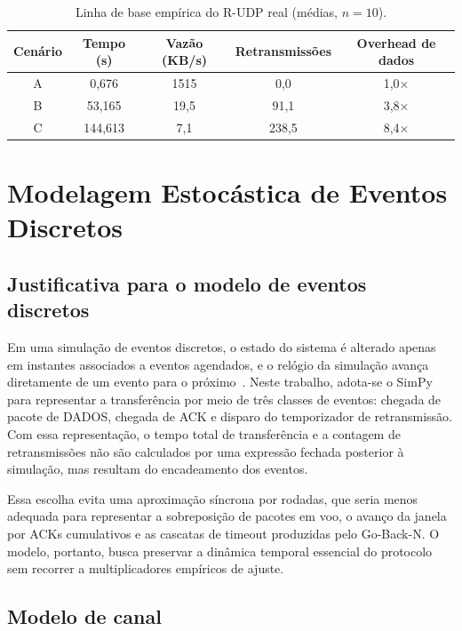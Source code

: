 \documentclass[12pt]{article}
\begin{document}
\begin{table}[ht]
\centering
\caption{Linha de base empírica do R-UDP real (médias, $n=10$).}
\label{tab:baseline}
\begin{tabular}{ccccc}
\toprule
\textbf{Cenário} & \textbf{Tempo (s)} & \textbf{Vazão (KB/s)} &
\textbf{Retransmissões} & \textbf{Overhead de dados} \\
\midrule
A & 0{,}676   & 1515 & 0{,}0   & 1{,}0$\times$ \\
B & 53{,}165  & 19{,}5 & 91{,}1  & 3{,}8$\times$ \\
C & 144{,}613 & 7{,}1  & 238{,}5 & 8{,}4$\times$ \\
\bottomrule
\end{tabular}
\end{table}

\section{Modelagem Estocástica de Eventos Discretos}
\label{sec:modelo}

\subsection{Justificativa para o modelo de eventos discretos}

Em uma simulação de eventos discretos, o estado do sistema é alterado apenas em instantes
associados a eventos agendados, e o relógio da simulação avança diretamente de um evento
para o próximo~\cite{law2015}. Neste trabalho, adota-se o SimPy~\cite{simpy} para
representar a transferência por meio de três classes de eventos: chegada de pacote de
DADOS, chegada de ACK e disparo do temporizador de retransmissão. Com essa representação,
o tempo total de transferência e a contagem de retransmissões não são calculados por uma
expressão fechada posterior à simulação, mas resultam do encadeamento dos eventos.

Essa escolha evita uma aproximação síncrona por rodadas, que seria menos adequada para
representar a sobreposição de pacotes em voo, o avanço da janela por ACKs cumulativos e as
cascatas de timeout produzidas pelo Go-Back-N. O modelo, portanto, busca preservar a
dinâmica temporal essencial do protocolo sem recorrer a multiplicadores empíricos de
ajuste.

\subsection{Modelo de canal}
\label{sec:canal}
\end{document}
